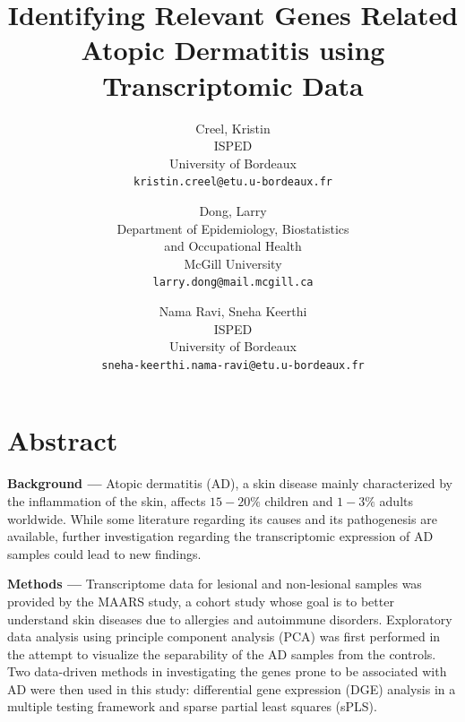 \documentclass[journal, a4paper]{IEEEtran}
\begin{document}
\title{\Large{Identifying Relevant Genes Related Atopic Dermatitis using Transcriptomic Data}}
\author{%
\begin{tabular}{c} Creel, Kristin \\ ISPED \\ University of Bordeaux \\ \texttt{kristin.creel@etu.u-bordeaux.fr} \end{tabular} \and
\begin{tabular}{c} Dong, Larry \\ Department of Epidemiology, Biostatistics \\ and Occupational Health \\ McGill University \\ \texttt{larry.dong@mail.mcgill.ca} \end{tabular} \and
\begin{tabular}{c} Nama Ravi, Sneha Keerthi \\ ISPED \\ University of Bordeaux \\ \texttt{sneha-keerthi.nama-ravi@etu.u-bordeaux.fr} \end{tabular}}
\maketitle





\section*{\textbf{Abstract}}

\textbf{Background --- } Atopic dermatitis (AD), a skin disease mainly characterized by the inflammation of the skin, affects $15-20 \%$ children and $1-3\%$ adults worldwide. While some literature regarding its causes and its pathogenesis are available, further investigation regarding the transcriptomic expression of AD samples could lead to new findings.%

\textbf{Methods ---} Transcriptome data for lesional and non-lesional samples was provided by the MAARS study, a cohort study whose goal is to better understand skin diseases due to allergies and autoimmune disorders. Exploratory data analysis using principle component analysis (PCA) was first performed in the attempt to visualize the separability of the AD samples from the controls. Two data-driven methods in investigating the genes prone to be associated with AD were then used in this study: differential gene expression (DGE) analysis in a multiple testing framework and sparse partial least squares (sPLS).
\end{document}
